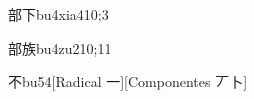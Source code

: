 \begin{verbete}{部下}{bu4xia4}{10;3}
\end{verbete}

\begin{verbete}{部族}{bu4zu2}{10;11}
\end{verbete}

\begin{verbete}{不}{bu5}{4}[Radical 一][Componentes 丆卜]
\end{verbete}

